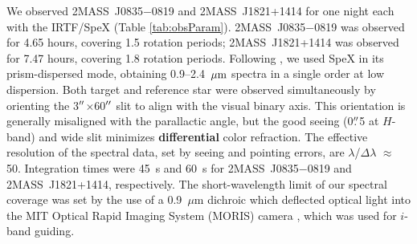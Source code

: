 \documentclass[twocolumn]{aastex6}
\newcommand{\sha}{2MASS~J0835$-$0819}
\newcommand{\shb}{2MASS~J1821+1414}
\begin{document}
We observed {\sha} and {\shb} for one night each with the IRTF/SpeX (Table \ref{tab:obsParam}).
{\sha} was observed for 4.65 hours, covering 1.5 rotation periods; {\shb} was observed for 7.47 hours, covering 1.8 rotation periods.
Following \citet{2014ApJ...783....5S}, we used SpeX in its prism-dispersed mode, obtaining 0.9--2.4~$\mbox{$\mu$m}$ spectra in a single order at low dispersion. 
Both target and reference star were observed simultaneously by orienting the 3$\mbox{$^{\prime\prime}$}$$\times$60$\mbox{$^{\prime\prime}$}$ slit to align with the visual binary axis. This orientation is generally misaligned with the parallactic angle, but the good seeing (0$\mbox{$.\!\!^{\prime\prime}$}$5 at $H$-band) and wide slit minimizes \textbf{differential} color refraction. The effective resolution of the spectral data, set by seeing and pointing errors, are $\lambda$/$\Delta\lambda$ $\approx$ 50. Integration times were 45~s and 60~s for {\sha} and {\shb}, respectively. The short-wavelength limit of our spectral coverage was set by the use of a 0.9~$\mu$m dichroic which deflected optical light into the MIT Optical Rapid Imaging System (MORIS) camera \citep{2011PASP..123..461G}, which was used for $i$-band guiding.



\end{document}

